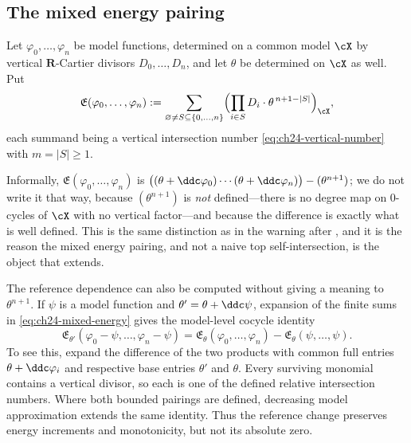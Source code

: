 \subsection{The mixed energy pairing}
\label{sec:ch24-energy-pairing}

\begin{definition}\label{def:ch24-mixed-energy}
Let $\varphi_0,\ldots,\varphi_n$ be model functions, determined on a common
model $\cX$ by vertical $\mathbf R$-Cartier divisors
$D_0,\ldots,D_n$, and let $\theta$ be determined on $\cX$ as well.
Put
\begin{equation}
\label{eq:ch24-mixed-energy}
 \mathfrak E(\varphi_0,\ldots,\varphi_n)
 :=\sum_{\varnothing\neq S\subseteq\{0,\ldots,n\}}
    \Bigl(\prod_{i\in S}D_i\cdot\theta^{\,n+1-|S|}\Bigr)_{\cX},
\end{equation}
each summand being a vertical intersection number
\eqref{eq:ch24-vertical-number} with $m=|S|\geq1$.
\end{definition}

Informally, $\mathfrak E(\varphi_0,\ldots,\varphi_n)$ is
$\bigl((\theta+\ddc\varphi_0)\cdots(\theta+\ddc\varphi_n)\bigr)
 -(\theta^{n+1})$; we do not write it that way, because
$(\theta^{n+1})$ is \emph{not} defined---there is no degree map on
$0$-cycles of $\cX$ with no vertical factor---and because the difference
is exactly what is well defined.  This is the same distinction as in the
warning after , and it is the reason the
mixed energy pairing, and not a naive top self-intersection, is the object
that extends.

The reference dependence can also be computed without giving a meaning to
$\theta^{n+1}$.  If $\psi$ is a model function and
$\theta'=\theta+\ddc\psi$, expansion of the finite sums in
\eqref{eq:ch24-mixed-energy} gives the model-level cocycle identity
\[
 \mathfrak E_{\theta'}(\varphi_0-\psi,\ldots,\varphi_n-\psi)
 =\mathfrak E_\theta(\varphi_0,\ldots,\varphi_n)
  -\mathfrak E_\theta(\psi,\ldots,\psi).
\]
To see this, expand the difference of the two products with common full
entries $\theta+\ddc\varphi_i$ and respective base entries $\theta'$
and $\theta$.  Every surviving monomial contains a vertical divisor,
so each is one of the defined relative intersection numbers.
Where both bounded pairings are defined, decreasing model approximation
extends the same identity.  Thus the reference change preserves energy
increments and monotonicity, but not its absolute zero.

